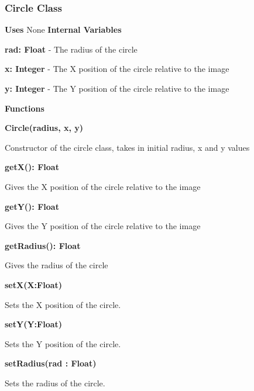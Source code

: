 \documentclass [10pt]{article}
\begin{document}
\subsubsection{Circle Class}

\textbf{Uses}
None
\textbf{Internal Variables}

\textbf{rad: Float} - The radius of the circle

\textbf{x: Integer} - The X position of the circle relative to the image

\textbf{y: Integer} - The Y position of the circle relative to the image 

\textbf{Functions}

\textbf{Circle(radius, x, y)}

Constructor of the circle class, takes in initial radius, x and y values

\textbf{getX(): Float}

Gives the X position of the circle relative to the image

\textbf{getY(): Float}

Gives the Y position of the circle relative to the image

\textbf{getRadius(): Float}

Gives the radius of the circle

\textbf{setX(X:Float)}

Sets the X position of the circle.

\textbf{setY(Y:Float)}

Sets the Y position of the circle.

\textbf{setRadius(rad : Float)}

Sets the radius of the circle.

\end{document}
